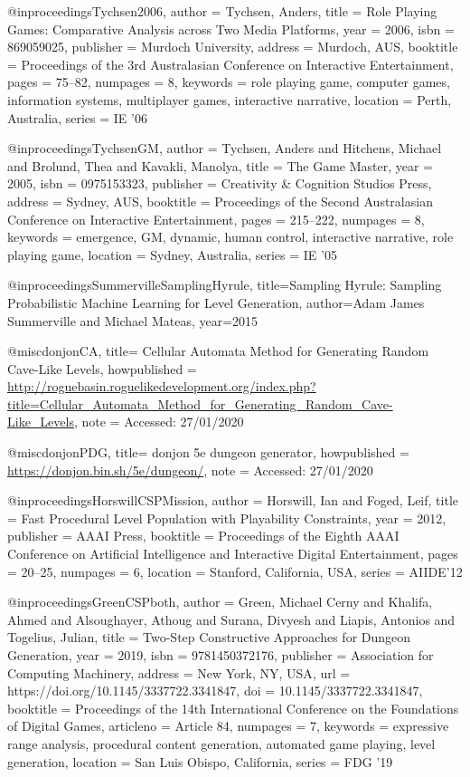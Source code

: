 @inproceedings{Tychsen2006,
author = {Tychsen, Anders},
title = {Role Playing Games: Comparative Analysis across Two Media Platforms},
year = {2006},
isbn = {869059025},
publisher = {Murdoch University},
address = {Murdoch, AUS},
booktitle = {Proceedings of the 3rd Australasian Conference on Interactive Entertainment},
pages = {75–82},
numpages = {8},
keywords = {role playing game, computer games, information systems, multiplayer games, interactive narrative},
location = {Perth, Australia},
series = {IE ’06}
}

@inproceedings{TychsenGM,
author = {Tychsen, Anders and Hitchens, Michael and Brolund, Thea and Kavakli, Manolya},
title = {The Game Master},
year = {2005},
isbn = {0975153323},
publisher = {Creativity \& Cognition Studios Press},
address = {Sydney, AUS},
booktitle = {Proceedings of the Second Australasian Conference on Interactive Entertainment},
pages = {215–222},
numpages = {8},
keywords = {emergence, GM, dynamic, human control, interactive narrative, role playing game},
location = {Sydney, Australia},
series = {IE ’05}
}
  


@inproceedings{SummervilleSamplingHyrule,
  title={Sampling Hyrule: Sampling Probabilistic Machine Learning for Level Generation},
  author={Adam James Summerville and Michael Mateas},
  year={2015}
}

@misc{donjonCA,
title= {Cellular Automata Method for Generating Random Cave-Like Levels},
howpublished = {\url{http://roguebasin.roguelikedevelopment.org/index.php?title=Cellular_Automata_Method_for_Generating_Random_Cave-Like_Levels}},
note = {Accessed: 27/01/2020}
}

@misc{donjonPDG,
title= {donjon 5e dungeon generator},
howpublished = {\url{https://donjon.bin.sh/5e/dungeon/}},
note = {Accessed: 27/01/2020}
}

@inproceedings{HorswillCSPMission,
author = {Horswill, Ian and Foged, Leif},
title = {Fast Procedural Level Population with Playability Constraints},
year = {2012},
publisher = {AAAI Press},
booktitle = {Proceedings of the Eighth AAAI Conference on Artificial Intelligence and Interactive Digital Entertainment},
pages = {20–25},
numpages = {6},
location = {Stanford, California, USA},
series = {AIIDE’12}
}

@inproceedings{GreenCSPboth,
author = {Green, Michael Cerny and Khalifa, Ahmed and Alsoughayer, Athoug and Surana, Divyesh and Liapis, Antonios and Togelius, Julian},
title = {Two-Step Constructive Approaches for Dungeon Generation},
year = {2019},
isbn = {9781450372176},
publisher = {Association for Computing Machinery},
address = {New York, NY, USA},
url = {https://doi.org/10.1145/3337722.3341847},
doi = {10.1145/3337722.3341847},
booktitle = {Proceedings of the 14th International Conference on the Foundations of Digital Games},
articleno = {Article 84},
numpages = {7},
keywords = {expressive range analysis, procedural content generation, automated game playing, level generation},
location = {San Luis Obispo, California},
series = {FDG ’19}
}
  


